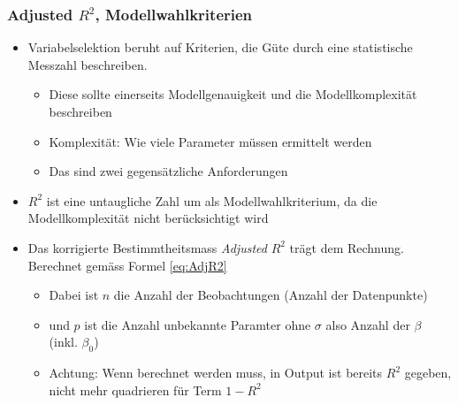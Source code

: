 \subsubsection{Adjusted $R^2$, Modellwahlkriterien}
\begin{itemize}
	\item Variabelselektion beruht auf Kriterien, die Güte durch eine statistische Messzahl beschreiben. 
	\begin{itemize}
		\item Diese sollte einerseits Modellgenauigkeit und die Modellkomplexität beschreiben
		\item Komplexität: Wie viele Parameter müssen ermittelt werden
		\item Das sind zwei gegensätzliche Anforderungen
	\end{itemize}
	\item $R^2$ ist eine untaugliche Zahl um als Modellwahlkriterium, da die Modellkomplexität nicht berücksichtigt wird
	\item Das korrigierte Bestimmtheitsmass \textit{Adjusted }$R^2$ trägt dem Rechnung. Berechnet gemäss Formel \ref{eq:AdjR2}
	\begin{itemize}
		\item Dabei ist $n$ die Anzahl der Beobachtungen (Anzahl der Datenpunkte)
		\item und $p$ ist die Anzahl unbekannte Paramter ohne $\sigma$ also Anzahl der $\beta$ (inkl. $\beta_0$)
		\item Achtung: Wenn berechnet werden muss, in Output ist bereits $R^2$ gegeben, nicht mehr quadrieren für Term $1-R^2$
	\end{itemize}
\end{itemize}

